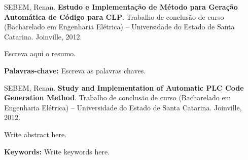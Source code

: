 \begin{resumo}
SEBEM, Renan. \textbf{Estudo e Implementação de Método para Geração Automática de Código para CLP}. Trabalho de conclusão de curso (Bacharelado em Engenharia Elétrica) -- Universidade do Estado de Santa Catarina. Joinville, 2012.

Escreva aqui o resumo.

\textbf{Palavras-chave:} Escreva as palavras chaves.

\end{resumo}

\begin{udescabstract}
SEBEM, Renan. \textbf{Study and Implementation of Automatic PLC Code Generation Method}. Trabalho de conclusão de curso (Bacharelado em Engenharia Elétrica) -- Universidade do Estado de Santa Catarina. Joinville, 2012.

Write abstract here.

\textbf{Keywords:} Write keywords here.

\end{udescabstract}